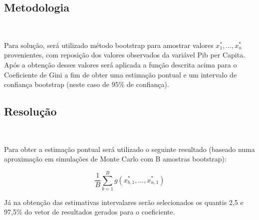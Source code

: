 \documentclass[11pt,]{article}
\begin{document}
\hypertarget{metodologia}{%
\subsection{Metodologia}\label{metodologia}}

~

Para solução, será utilizado método bootstrap para amostrar valores
\(x_1^*, ..., x_n^*\) provenientes, com reposição dos valores observados
da variável Pib per Capita. Após a obtenção desses valores será aplicada
a função descrita acima para o Coeficiente de Gini a fim de obter uma
estimação pontual e um intervalo de confiança bootstrap (neste caso de
95\% de confiança).

\hypertarget{resoluuxe7uxe3o}{%
\subsection{Resolução}\label{resoluuxe7uxe3o}}

~

Para obter a estimação pontual será utilizado o seguinte resultado
(baseado numa aproximação em simulações de Monte Carlo com B amostras
bootstrap):

\[\frac{1}{B}\sum_{b=1}^B g(x_{b,1}^*, ..., x_{n,1}^*)\]

Já na obtenção das estimativas intervalares serão selecionados os
quantis 2,5 e 97,5\% do vetor de resultados gerados para o coeficiente.

\newpage
\end{document}
